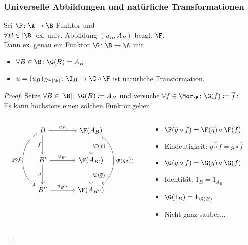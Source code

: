 \begin{frame}[fragile]
  \frametitle{Universelle Abbildungen und natürliche Transformationen}
  \begin{thm*}
    Sei $\F \colon \A \to \B$ Funktor und \\
    $\forall B \in |\B|$ ex. univ. Abbildung $(u_B, A_B)$ bezgl. $\F$. \\
    Dann ex. genau ein Funktor $\G \colon \B \to \A$ mit
    \begin{itemize}
      \item $\forall B \in \B \colon \G(B) = A_B$.
      \item $u = (u_B)_{B \in |\B|} \colon \I_B \to \G \circ \F$ ist natürliche Transformation.
    \end{itemize}
  \end{thm*}

  \begin{proof}
    Setze $\forall B \in |\B| \colon \G(B) \coloneqq A_B$ und versuche $\forall f \in \Mor_\B \colon \G(f) \coloneqq \overline f$:\\
    Es kann h\"ochstens einen solchen Funktor geben!
    \vspace{1em}
    \pause
    \begin{columns}
      \begin{column}{0.5\textwidth}
    $$
        \begin{tikzcd}[column sep=3.5em,row sep=2.5em]
          B \arrow[r,"u_B"] \arrow[d,"f"'] \arrow[dd,"g \circ f"',bend right=60]    & \F(A_B)    \arrow[d,"\F(\overline f)"] \arrow[dd, bend left=60, "\F(\overline g \circ \overline f)"] 
      \\ 
      B'\arrow[r,"u_{B'}"] \arrow[d,"g"'] & \F(A_{B'}) \arrow[d ,"\F(\overline g)"] \\
      B''\arrow[r,"u_{B''}"]              & \F(A_{B''}) 
    \end{tikzcd}
    $$
      \end{column}
      \pause
      \begin{column}{0.5\textwidth}
        \begin{itemize}
          \item<+-> $\F(\overline g \circ \overline f) = \F(\overline g) \circ \F(\overline f)$
          \item<+-> Eindeutigkeit: $\overline{g \circ f} = \overline g \circ \overline f $
          \item<+-> $\G(g \circ f) = \G( g ) \circ \G( f) $
          \item<+-> Identit\"at: $\overline{1_B} = 1_{A_B}$
          \item<+-> $\G(1_B) = 1_{\G(B)}$ 
          \item<+-> Nicht ganz sauber... \qedhere
        \end{itemize}
      \end{column}
    \end{columns}
  \end{proof}
  \vspace{0.25em}
\end{frame}

